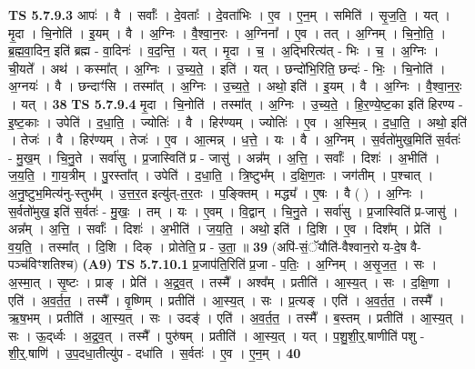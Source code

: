 \documentclass[17pt]{extarticle}
\begin{document}
                  \newline
                                \textbf{ TS 5.7.9.3} \newline
                  आपः॑ । वै । सर्वाः᳚ । दे॒वताः᳚ । दे॒वता॑भिः । ए॒व । ए॒न॒म् । समिति॑ । सृ॒ज॒ति॒ । यत् । मृ॒दा । चि॒नोति॑ । इ॒यम् । वै । अ॒ग्निः । वै॒श्वा॒न॒रः । अ॒ग्निना᳚ । ए॒व । तत् । अ॒ग्निम् । चि॒नो॒ति॒ । ब्र॒ह्म॒वा॒दिन॒ इति॑ ब्रह्म - वा॒दिनः॑ । व॒द॒न्ति॒ । यत् । मृ॒दा । च॒ । अ॒द्भिरित्य॑त् - भिः । च॒ । अ॒ग्निः । ची॒यते᳚ । अथ॑ । कस्मा᳚त् । अ॒ग्निः । उ॒च्य॒ते॒ । इति॑ । यत् । छन्दो॑भि॒रिति॒ छन्दः॑ - भिः॒ । चि॒नोति॑ । अ॒ग्नयः॑ । वै । छन्दाꣳ॑सि । तस्मा᳚त् । अ॒ग्निः । उ॒च्य॒ते॒ । अथो॒ इति॑ । इ॒यम् । वै । अ॒ग्निः । वै॒श्वा॒न॒रः॒ । यत् । \textbf{  38} \newline
                  \newline
                                \textbf{ TS 5.7.9.4} \newline
                  मृ॒दा । चि॒नोति॑ । तस्मा᳚त् । अ॒ग्निः । उ॒च्य॒ते॒ । हि॒र॒ण्ये॒ष्ट॒का इति॑ हिरण्य - इ॒ष्ट॒काः । उपेति॑ । द॒धा॒ति॒ । ज्योतिः॑ । वै । हिर॑ण्यम् । ज्योतिः॑ । ए॒व । अ॒स्मि॒न्न् । द॒धा॒ति॒ । अथो॒ इति॑ । तेजः॑ । वै । हिर॑ण्यम् । तेजः॑ । ए॒व । आ॒त्मन्न् । ध॒त्ते॒ । यः । वै । अ॒ग्निम् । स॒र्वतो॑मुख॒मिति॑ स॒र्वतः॑ - मु॒ख॒म् । चि॒नु॒ते । सर्वा॑सु । प्र॒जास्विति॑ प्र - जासु॑ । अन्न᳚म् । अ॒त्ति॒ । सर्वाः᳚ । दिशः॑ । अ॒भीति॑ । ज॒य॒ति॒ । गा॒य॒त्रीम् । पु॒रस्ता᳚त् । उपेति॑ । द॒धा॒ति॒ । त्रि॒ष्टुभ᳚म् । द॒क्षि॒ण॒तः । जग॑तीम् । प॒श्चात् । अ॒नु॒ष्टुभ॒मित्य॑नु-स्तुभ᳚म् । उ॒त्त॒र॒त इत्यु॑त्-त॒र॒तः । प॒ङ्क्तिम् । मद्ध्य᳚ । ए॒षः । वै ( ) । अ॒ग्निः । स॒र्वतो॑मुख॒ इति॑ स॒र्वतः॑ - मु॒खः॒ । तम् । यः । ए॒वम् । वि॒द्वान् । चि॒नु॒ते । सर्वा॑सु । प्र॒जास्विति॑ प्र-जासु॑ । अन्न᳚म् । अ॒त्ति॒ । सर्वाः᳚ । दिशः॑ । अ॒भीति॑ । ज॒य॒ति॒ । अथो॒ इति॑ । दि॒शि । ए॒व । दिश᳚म् । प्रेति॑ । व॒य॒ति॒ । तस्मा᳚त् । दि॒शि । दिक् । प्रोतेति॒ प्र - उ॒ता॒ ॥ \textbf{  39 } \newline
                  \newline
                      (अपि॑-सं॒ॅयौति॑-वैश्वान॒रो य-दे॒ष वै-पञ्च॑विꣳशतिश्च)  \textbf{(A9)} \newline \newline
                                \textbf{ TS 5.7.10.1} \newline
                  प्र॒जाप॑ति॒रिति॑ प्र॒जा - प॒तिः॒ । अ॒ग्निम् । अ॒सृ॒ज॒त॒ । सः । अ॒स्मा॒त् । सृ॒ष्टः । प्राङ् । प्रेति॑ । अ॒द्र॒व॒त् । तस्मै᳚ । अश्व᳚म् । प्रतीति॑ । आ॒स्य॒त् । सः । द॒क्षि॒णा । एति॑ । अ॒व॒र्त॒त॒ । तस्मै᳚ । वृ॒ष्णिम् । प्रतीति॑ । आ॒स्य॒त् । सः । प्र॒त्यङ् । एति॑ । अ॒व॒र्त॒त॒ । तस्मै᳚ । ऋ॒ष॒भम् । प्रतीति॑ । आ॒स्य॒त् । सः । उदङ्॑ । एति॑ । अ॒व॒र्त॒त॒ । तस्मै᳚ । ब॒स्तम् । प्रतीति॑ । आ॒स्य॒त् । सः । ऊ॒द्‌र्ध्वः । अ॒द्र॒व॒त् । तस्मै᳚ । पुरु॑षम् । प्रतीति॑ । आ॒स्य॒त् । यत् । प॒शु॒शी॒र्॒.षाणीति॑ पशु - शी॒र्॒.षाणि॑ । उ॒प॒दधा॒तीत्यु॑प - दधा॑ति । स॒र्वतः॑ । ए॒व । ए॒न॒म् । \textbf{  40} \newline
\end{document}
